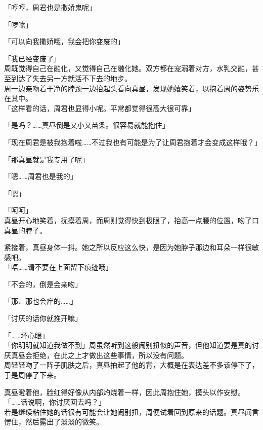 「哼哼，周君也是撒娇鬼呢」

「啰嗦」

「可以向我撒娇哦，我会把你变废的」

「我已经变废了」\\

周既觉得自己在融化，又觉得自己在融化她。双方都在宠溺着对方，水乳交融，甚至到达了失去另一方就活不下去的地步。\\

周一边亲吻着干净的脖颈一边抬起头看向真昼，发现她嬉笑着，以抱着周的姿势乐在其中。\\

「这样看的话，周君也显得小呢。平常都觉得很高大很可靠」

「是吗？……真昼倒是又小又苗条。很容易就能抱住」

「现在周君是被我抱着啦……不过我也有可能是为了让周君抱着才会变成这样哦？」

「那真昼就是我专用了呢」

「嗯……周君也是我的」

「嗯」

「呵呵」\\

真昼开心地笑着，抚摸着周，而周则觉得快到极限了，抬高一点腰的位置，吻了口真昼的脖子。

紧接着，真昼身体一抖。她之所以反应这么快，是因为她脖子那边和耳朵一样很敏感吧。\\

「唔……请不要在上面留下痕迹哦」

「不会的，倒是会亲吻」

「那、那也会痒的……」

「讨厌的话你就推开嘛」

「……坏心眼」\\

「你明明就知道我做不到」周虽然听到这般闹别扭似的声音，但他知道要是真的讨厌真昼会拒绝，在此之上才做出这些事情，所以没有问题。\\

周轻轻吻了一阵子肌肤之后，真昼拍起了他的背，大概是在表达差不多该停下了，于是周停了下来。

真昼瞪着他，脸红得好像从内部灼烧着一样，因此周抱住她，摸头以作安慰。\\

「……话说啊，你讨厌回去吗？」\\

若是继续粘住她的话很有可能会让她闹别扭，周便试着回到原来的话题。真昼闻言愣住，然后露出了淡淡的微笑。\\

